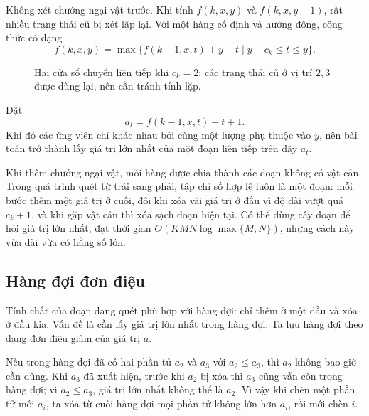 \documentclass[11pt]{article}
\begin{document}
Không xét chướng ngại vật trước. Khi tính $f(k,x,y)$ và $f(k,x,y+1)$, rất
nhiều trạng thái cũ bị xét lặp lại. Với một hàng cố định và hướng đông, công
thức có dạng
\[
  f(k,x,y)=
  \max\{f(k-1,x,t)+y-t\mid y-c_k\le t\le y\}.
\]
\begin{figure}[ht]
\centering
{}
\caption{Hai cửa sổ chuyển liên tiếp khi \(c_k=2\): các trạng thái cũ ở vị trí \(2,3\) được dùng lại, nên cần tránh tính lặp.}
\end{figure}
Đặt
\[
  a_t=f(k-1,x,t)-t+1.
\]
Khi đó các ứng viên chỉ khác nhau bởi cùng một lượng phụ thuộc vào $y$, nên
bài toán trở thành lấy giá trị lớn nhất của một đoạn liên tiếp trên dãy
$a_t$.

Khi thêm chướng ngại vật, mỗi hàng được chia thành các đoạn không có vật cản.
Trong quá trình quét từ trái sang phải, tập chỉ số hợp lệ luôn là một đoạn:
mỗi bước thêm một giá trị ở cuối, đôi khi xóa vài giá trị ở đầu vì độ dài
vượt quá $c_k+1$, và khi gặp vật cản thì xóa sạch đoạn hiện tại. Có thể dùng
cây đoạn để hỏi giá trị lớn nhất, đạt thời gian
$O(KMN\log\max\{M,N\})$, nhưng cách này vừa dài vừa có hằng số lớn.

\subsection*{Hàng đợi đơn điệu}

Tính chất của đoạn đang quét phù hợp với hàng đợi: chỉ thêm ở một đầu và xóa
ở đầu kia. Vấn đề là cần lấy giá trị lớn nhất trong hàng đợi. Ta lưu hàng đợi
theo dạng đơn điệu giảm của giá trị $a$.

Nếu trong hàng đợi đã có hai phần tử $a_2$ và $a_3$ với $a_2\le a_3$, thì
$a_2$ không bao giờ cần dùng. Khi $a_3$ đã xuất hiện, trước khi $a_2$ bị xóa
thì $a_3$ cũng vẫn còn trong hàng đợi; vì $a_2\le a_3$, giá trị lớn nhất
không thể là $a_2$. Vì vậy khi chèn một phần tử mới $a_i$, ta xóa từ cuối
hàng đợi mọi phần tử không lớn hơn $a_i$, rồi mới chèn $i$.
\end{document}

